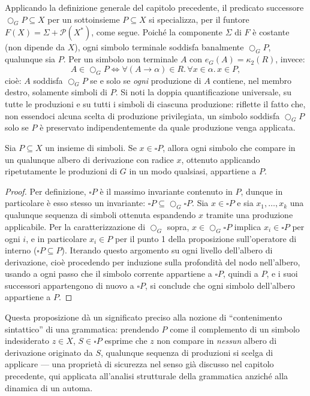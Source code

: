 Applicando la definizione generale del capitolo precedente, il predicato successore \(\bigcirc_G P \subseteq X\) per un sottoinsieme \(P \subseteq X\) si specializza, per il funtore \(F(X) = \Sigma + \mathcal{P}(X^*)\), come segue. Poiché la componente \(\Sigma\) di \(F\) è costante (non dipende da \(X\)), ogni simbolo terminale soddisfa banalmente \(\bigcirc_G P\), qualunque sia \(P\). Per un simbolo non terminale \(A\) con \(e_G(A) = \kappa_2(R)\), invece:
\[
  A \in \bigcirc_G P \iff \forall (A \to \alpha) \in R.\, \forall x \in \alpha.\, x \in P,
\]
cioè: \(A\) soddisfa \(\bigcirc_G P\) se e solo se \textit{ogni} produzione di \(A\) contiene, nel membro destro, solamente simboli di \(P\). Si noti la doppia quantificazione universale, su tutte le produzioni e su tutti i simboli di ciascuna produzione: riflette il fatto che, non essendoci alcuna scelta di produzione privilegiata, un simbolo soddisfa \(\bigcirc_G P\) solo se \(P\) è preservato indipendentemente da quale produzione venga applicata.

\begin{proposition}
  Sia \(P \subseteq X\) un insieme di simboli. Se \(x \in \square P\), allora ogni simbolo che compare in un qualunque albero di derivazione con radice \(x\), ottenuto applicando ripetutamente le produzioni di \(G\) in un modo qualsiasi, appartiene a \(P\).
\end{proposition}

\begin{proof}
  Per definizione, \(\square P\) è il massimo invariante contenuto in \(P\), dunque in particolare è esso stesso un invariante: \(\square P \subseteq \bigcirc_G \square P\). Sia \(x \in \square P\) e sia \(x_1, \ldots, x_k\) una qualunque sequenza di simboli ottenuta espandendo \(x\) tramite una produzione applicabile. Per la caratterizzazione di \(\bigcirc_G\) sopra, \(x \in \bigcirc_G\square P\) implica \(x_i \in \square P\) per ogni \(i\), e in particolare \(x_i \in P\) per il punto 1 della proposizione sull'operatore di interno (\(\square P \subseteq P\)). Iterando questo argomento su ogni livello dell'albero di derivazione, cioè procedendo per induzione sulla profondità del nodo nell'albero, usando a ogni passo che il simbolo corrente appartiene a \(\square P\), quindi a \(P\), e i suoi successori appartengono di nuovo a \(\square P\), si conclude che ogni simbolo dell'albero appartiene a \(P\).
\end{proof}

Questa proposizione dà un significato preciso alla nozione di ``contenimento sintattico'' di una grammatica: prendendo \(P\) come il complemento di un simbolo indesiderato \(z \in X\), \(S \in \square P\) esprime che \(z\) non compare in \textit{nessun} albero di derivazione originato da \(S\), qualunque sequenza di produzioni si scelga di applicare — una proprietà di sicurezza nel senso già discusso nel capitolo precedente, qui applicata all'analisi strutturale della grammatica anziché alla dinamica di un automa.

